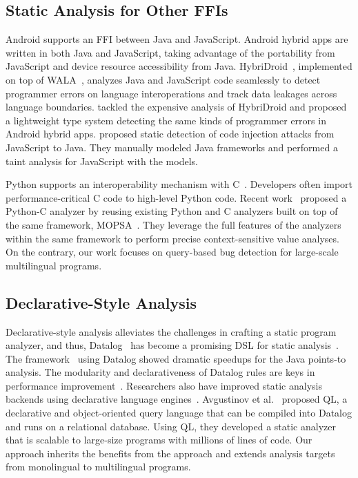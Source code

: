 \subsection{Static Analysis for Other FFIs}
Android supports an FFI between Java and JavaScript.  Android hybrid apps are
written in both Java and JavaScript, taking advantage of the portability from
JavaScript and device resource accessibility from Java.
HybriDroid~\cite{hybridroid}, implemented on top of WALA~\cite{WALA}, analyzes
Java and JavaScript code seamlessly to detect programmer errors on language
interoperations and track data leakages across language boundaries.
\citet{BaeICSE19} tackled the expensive analysis of HybriDroid and proposed
a lightweight type system detecting the same kinds of programmer errors in
Android hybrid apps.  \citet{jin2014code} proposed static detection
of code injection attacks from JavaScript to Java.  They manually
modeled Java frameworks and performed a taint analysis for JavaScript with the models.


Python supports an interoperability mechanism with C~\cite{PythonC}.
Developers often import performance-critical C code to high-level Python code.
Recent work~\cite{sas2021} proposed a Python-C analyzer by reusing existing
Python and C analyzers built on top of the same framework, MOPSA~\cite{Mopsa}.
They leverage the full features of the analyzers within the same framework to
perform precise context-sensitive value analyses. On the contrary, our work focuses
on query-based bug detection for large-scale multilingual programs. 


\subsection{Declarative-Style Analysis}
Declarative-style analysis alleviates the challenges in crafting a static program
analyzer, and thus, Datalog~\cite{allen2015D, allen2015stagedD, alpuente2010D,
doop, dawson1996D, naik2006D, reps1994D, smaragdakis2014D, whaley2005D} has
become a promising DSL for static analysis~\cite{scholz2016}.
The \doop framework~\cite{doop} using Datalog showed
dramatic speedups for the Java points-to analysis.  The
modularity and declarativeness of Datalog rules are keys in performance
improvement~\cite{doopWorkshop}.  Researchers also have improved static
analysis backends using declarative language engines~\cite{whaley2005D,
hoder2011muz, souffle, madsen2016}.  Avgustinov et al.~\cite{ql2016} proposed
QL, a declarative and object-oriented query language that can be compiled into
Datalog and runs on a relational database. Using QL, they developed a static
analyzer that is scalable to large-size programs with millions of lines of
code.  Our approach inherits the benefits from the approach and
extends analysis targets from monolingual to multilingual programs.
